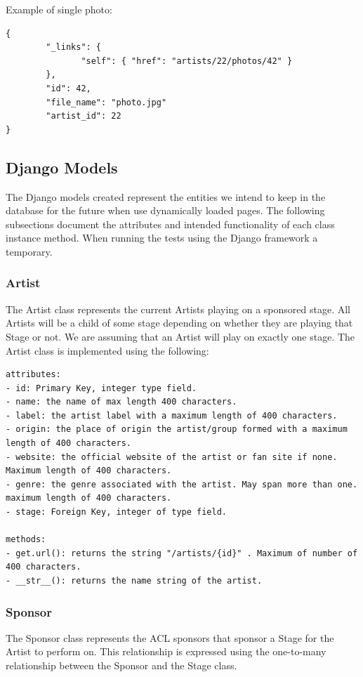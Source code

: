 \documentclass[12pt,english]{scrartcl}
\begin{document}
Example of single photo:
\begin{verbatim}
{
        "_links": {
               "self": { "href": "artists/22/photos/42" }
        },
        "id": 42,
        "file_name": "photo.jpg"
        "artist_id": 22
}
\end{verbatim}

\subsection{Django Models}
The Django models created represent the entities we intend to keep in the database for the future when use dynamically loaded pages.
The following subsections document the attributes and intended functionality of each class instance method. When running the tests
using the Django framework a temporary. 

\subsubsection{Artist}
The Artist class represents the current Artists playing on a sponsored stage. All Artists will be a child of some
stage depending on whether they are playing that Stage or not. We are assuming that an Artist will play on 
exactly one stage. The Artist class is implemented using the following:
\begin{verbatim}
attributes:
- id: Primary Key, integer type field.
- name: the name of max length 400 characters.
- label: the artist label with a maximum length of 400 characters.
- origin: the place of origin the artist/group formed with a maximum length of 400 characters.
- website: the official website of the artist or fan site if none. Maximum length of 400 characters.
- genre: the genre associated with the artist. May span more than one. maximum length of 400 characters.
- stage: Foreign Key, integer of type field.

methods:
- get.url(): returns the string "/artists/{id}" . Maximum of number of 400 characters.
- __str__(): returns the name string of the artist.
\end{verbatim}


\subsubsection{Sponsor}
The Sponsor class represents the ACL sponsors that sponsor a Stage for the Artist to perform on.
This relationship is expressed using the one-to-many relationship between the Sponsor and the Stage
class. 
\end{document}
